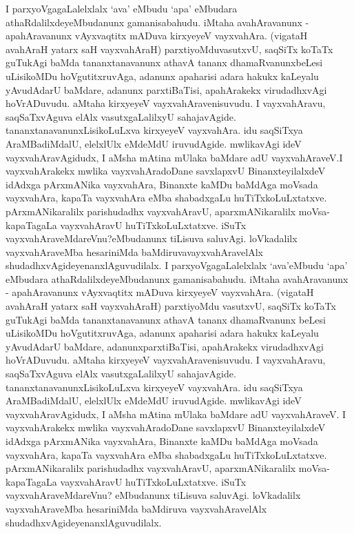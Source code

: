 I parxyoVgagaLalelxlalx `ava' eMbudu `apa' eMbudara athaRdalilxde\-yeMbu\-danunx gamanisa\-bahudu. iMtaha avahAravanunx - apahAravanunx vAyxvaqtitx mADuva kirxyeyeV vayxvahAra. (vigataH ava\-hAraH yatarx saH vayxvahAraH) parxtiyoMdu\break vasutxvU, saqSiTx koTaTx guTukAgi baMda tananxtanavanunx athavA tananx dhamaRvanunx\break beLesi uLisikoMDu hoVgutitxruvAga, adanunx apaharisi adara hakukx kaLeyalu yAvu\-dAdarU baMdare, adanunx parxtiBaTisi, apahArakekx virudadhxvAgi hoVrADuvudu. aMtaha kirxyeyeV vayxvahAravenisuvudu. I vayxvahAravu, saqSaTxvAguva elAlx vasutxgaLalilxyU sahajavAgide. tananxtanava\-nunxLisikoLuLxva kirxyeyeV vayxva\-hAra. idu saqSiTxya AraMBadiMdalU, elelxlUlx eMdeMdU iruvu\-dAgide. mwlika\-vAgi ideV vayxvahAravAgidudx, I aMsha mAtina mUlaka baMdare adU vayxvahA\-raveV.\break I vayxvahArakekx mwlika vayxvahAradoDane savxlapxvU BinanxteyilalxdeV idAdxga pArxmA\-Nika vayxvahAra, Binanxte kaMDu baMdAga moVsada vayxvahAra, kapaTa vayxvahAra eMba shabadxgaLu huTiTxkoLuLxtatxve. pArxmANi\-karalilx parishudadhx vayxvahAravU, aparxmANika\-ralilx moVsa-kapaTagaLa vayxvahAravU huTiTxkoLuLxtatxve. iSuTx vayxva\-hAraveMdareVnu?\break eMbu\-danunx tiLisuva saluvAgi. loVkadalilx vayxvahAraveMba hesariniMda baMdiruva\break vayxvahAravelAlx shudadhxvAgideyenanxlAguvudilalx.
I parxyoVgagaLalelxlalx `ava'\break \hbox{eMbudu} `apa' eMbudara athaRdalilxdeyeMbudanunx gamanisa\-bahudu. iMtaha avahAravanunx - apahAravanunx vAyxvaqtitx mADuva kirxyeyeV vayxvahAra. (\hbox{vigataH} ava\-hAraH yatarx saH vayxvahAraH) parxtiyoMdu vasutxvU, saqSiTx koTaTx guTukAgi baMda tananxtanavanunx athavA tananx dhamaRvanunx beLesi uLisikoMDu hoVgutitxru\-vAga, \hbox{adanunx}\- apaharisi adara hakukx kaLeyalu yAvu\-dAdarU baMdare, \hbox{adanunx}\break parxtiBaTisi, apahArakekx virudadhx\-vAgi hoVrADuvudu. aMtaha kirxyeyeV vayxva\-hAra\-venisuvudu. I vayxvahAravu, saqSaTxvAguva elAlx vasutx\-gaLalilxyU sahajavAgide. tananxtanava\-nunxLisikoLuLxva kirxyeyeV vayxvahAra. idu saqSiTxya AraMBadiM\-dalU, elelxlUlx eMdeMdU iruvudAgide. mwlikavAgi ideV vayxvahAravAgidudx, I aMsha mAtina mUlaka baMdare adU vayxvahAraveV. I vayxvahArakekx mwlika vayxva\-hAradoDane savxlapxvU Binanxte\-yilalxdeV idAdxga pArxmANika vayxvahAra, Binanxte kaMDu baMdAga moVsada vayxvahAra, kapaTa vayxvahAra eMba shabadx\-gaLu huTiTxkoLuLxtatxve. pArxmANikaralilx parishudadhx vayxvahAravU, aparxmANikaralilx moVsa-kapaTagaLa vayxva\-hAravU huTiTxkoLuLxtatxve. iSuTx vayxvahAraveMdareVnu? eMbudanunx tiLisuva salu\-vAgi. loVka\-dalilx vayxvahAraveMba hesariniMda baMdiruva vayxvahAravelAlx shudadhx\-vAgideyenanxlAguvudilalx.

